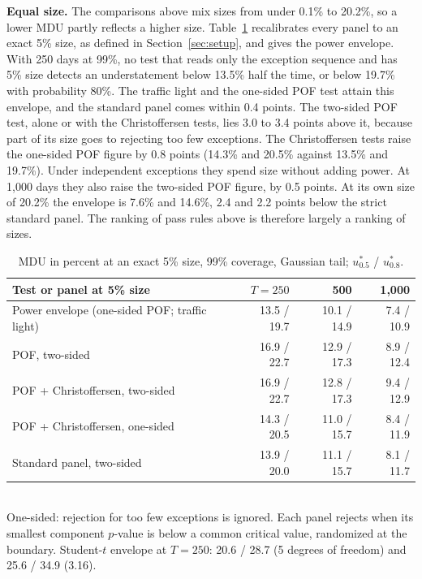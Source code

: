 \documentclass[11pt]{article}
\begin{document}
\textbf{Equal size.} The comparisons above mix sizes from under 0.1\% to 20.2\%,
so a lower MDU partly reflects a higher size. Table~\ref{tab:size} recalibrates
every panel to an exact 5\% size, as defined in Section~\ref{sec:setup}, and
gives the power envelope. With 250 days at 99\%, no test that reads only the
exception sequence and has 5\% size detects an understatement below 13.5\%
half the time, or below 19.7\% with probability 80\%. The traffic light and
the one-sided POF test attain this envelope, and the standard panel comes
within 0.4 points. The two-sided POF test, alone or with the Christoffersen
tests, lies 3.0 to 3.4 points above it, because part of its size goes to
rejecting too few exceptions. The Christoffersen tests raise the one-sided POF
figure by 0.8 points (14.3\% and 20.5\% against 13.5\% and 19.7\%). Under
independent exceptions they spend size without adding power. At 1,000 days
they also raise the two-sided POF figure, by 0.5 points. At its own size of
20.2\% the envelope is 7.6\% and 14.6\%, 2.4 and 2.2 points below the strict
standard panel. The ranking of pass rules above is therefore largely a ranking
of sizes.

\begin{table}[tbp]
\caption{MDU in percent at an exact 5\% size, 99\% coverage, Gaussian tail; $u^*_{0.5}$ / $u^*_{0.8}$.}
\label{tab:size}
\small
\centering
\begin{tabular}{lrrr}
\toprule
Test or panel at 5\% size & $T = 250$ & 500 & 1,000 \\
\midrule
Power envelope (one-sided POF; traffic light) & 13.5 / 19.7 & 10.1 / 14.9 & 7.4 / 10.9 \\
POF, two-sided & 16.9 / 22.7 & 12.9 / 17.3 & 8.9 / 12.4 \\
POF + Christoffersen, two-sided & 16.9 / 22.7 & 12.8 / 17.3 & 9.4 / 12.9 \\
POF + Christoffersen, one-sided & 14.3 / 20.5 & 11.0 / 15.7 & 8.4 / 11.9 \\
Standard panel, two-sided & 13.9 / 20.0 & 11.1 / 15.7 & 8.1 / 11.7 \\
\bottomrule
\end{tabular}
\\[2pt]
\footnotesize One-sided: rejection for too few exceptions is ignored. Each panel rejects when its smallest component $p$-value is below a common critical value, randomized at the boundary. Student-$t$ envelope at $T = 250$: 20.6 / 28.7 (5 degrees of freedom) and 25.6 / 34.9 (3.16).
\end{table}
\end{document}
